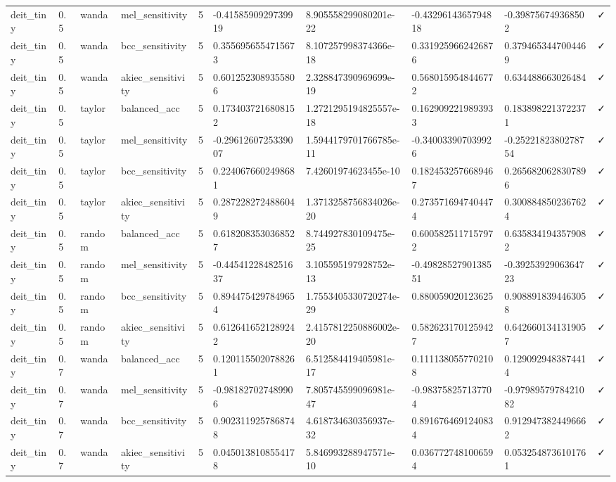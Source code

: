 \begin{table}[t]
\begin{tabular}{llllllllll}
deit\_tiny & 0.5 & wanda & mel\_sensitivity & 5 & -0.4158590929739919 & 8.905558299080201e-22 & -0.4329614365794818 & -0.398756749368502 & ✓ \\
deit\_tiny & 0.5 & wanda & bcc\_sensitivity & 5 & 0.3556956554715673 & 8.107257998374366e-18 & 0.3319259662426876 & 0.3794653447004469 & ✓ \\
deit\_tiny & 0.5 & wanda & akiec\_sensitivity & 5 & 0.6012523089355806 & 2.328847390969699e-19 & 0.5680159548446772 & 0.634488663026484 & ✓ \\
deit\_tiny & 0.5 & taylor & balanced\_acc & 5 & 0.1734037216808152 & 1.2721295194825557e-18 & 0.1629092219893933 & 0.1838982213722371 & ✓ \\
deit\_tiny & 0.5 & taylor & mel\_sensitivity & 5 & -0.2961260725339007 & 1.5944179701766785e-11 & -0.340033907039926 & -0.2522182380278754 & ✓ \\
deit\_tiny & 0.5 & taylor & bcc\_sensitivity & 5 & 0.2240676602498681 & 7.42601974623455e-10 & 0.1824532576689467 & 0.2656820628307896 & ✓ \\
deit\_tiny & 0.5 & taylor & akiec\_sensitivity & 5 & 0.2872282724886049 & 1.3713258756834026e-20 & 0.2735716947404474 & 0.3008848502367624 & ✓ \\
deit\_tiny & 0.5 & random & balanced\_acc & 5 & 0.6182083530368527 & 8.744927830109475e-25 & 0.6005825117157972 & 0.6358341943579082 & ✓ \\
deit\_tiny & 0.5 & random & mel\_sensitivity & 5 & -0.4454122848251637 & 3.105595197928752e-13 & -0.4982852790138551 & -0.3925392906364723 & ✓ \\
deit\_tiny & 0.5 & random & bcc\_sensitivity & 5 & 0.8944754297849654 & 1.7553405330720274e-29 & 0.880059020123625 & 0.9088918394463058 & ✓ \\
deit\_tiny & 0.5 & random & akiec\_sensitivity & 5 & 0.6126416521289242 & 2.4157812250886002e-20 & 0.5826231701259427 & 0.6426601341319057 & ✓ \\
deit\_tiny & 0.7 & wanda & balanced\_acc & 5 & 0.1201155020788261 & 6.512584419405981e-17 & 0.1111380557702108 & 0.1290929483874414 & ✓ \\
deit\_tiny & 0.7 & wanda & mel\_sensitivity & 5 & -0.981827027489906 & 7.805745599096981e-47 & -0.983758257137704 & -0.9798957978421082 & ✓ \\
deit\_tiny & 0.7 & wanda & bcc\_sensitivity & 5 & 0.9023119257868748 & 4.618734630356937e-32 & 0.8916764691240834 & 0.9129473824496662 & ✓ \\
deit\_tiny & 0.7 & wanda & akiec\_sensitivity & 5 & 0.0450138108554178 & 5.846993288947571e-10 & 0.0367727481006594 & 0.0532548736101761 & ✓ \\

\end{tabular}
\end{table}
